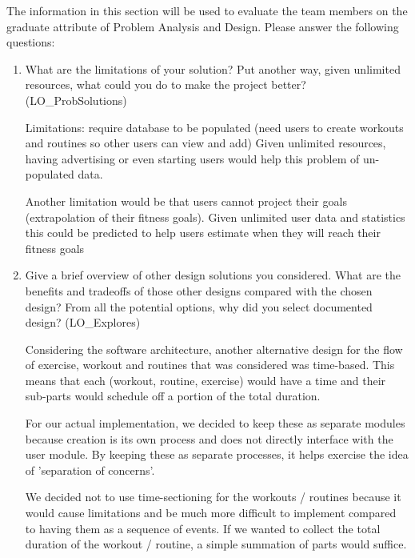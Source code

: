 \documentclass[12pt, titlepage]{article}
\begin{document}
	The information in this section will be used to evaluate the team members on the
	graduate attribute of Problem Analysis and Design.  Please answer the following questions:
	
	\begin{enumerate}
		\item What are the limitations of your solution?  Put another way, given
		unlimited resources, what could you do to make the project better? (LO\_ProbSolutions)
		
		Limitations: require database to be populated (need users to create workouts and routines so other users can view and add)
		Given unlimited resources, having advertising or even starting users would help this problem of un-populated data.
		
		Another limitation would be that users cannot project their goals (extrapolation of their fitness goals).
		Given unlimited user data and statistics this could be predicted to help users estimate when they will reach their fitness goals
		
		\item Give a brief overview of other design solutions you considered.  What
		are the benefits and tradeoffs of those other designs compared with the chosen
		design?  From all the potential options, why did you select documented design?
		(LO\_Explores)
		
		Considering the software architecture, another alternative design for the flow of exercise, workout and routines that was considered was time-based. This means that each (workout, routine, exercise) would have a time and their sub-parts would schedule off a portion of the total duration.

		For our actual implementation, we decided to keep these as separate modules because creation is its own process and does not directly interface with the user module. By keeping these as separate processes, it helps exercise the idea of 'separation of concerns'.
		
		We decided not to use time-sectioning for the workouts / routines because it would cause limitations and be much more difficult to implement compared to having them as a sequence of events. If we wanted to collect the total duration of the workout / routine, a simple summation of parts would suffice.
		
	\end{enumerate}
	
\end{document}
